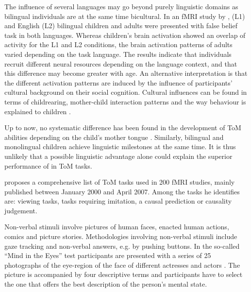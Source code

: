 \documentclass[output=paper]{LSP/langsci}
\begin{document}
The influence of several languages may go beyond purely linguistic domains as bilingual individuals are at the same time bicultural. In an fMRI study by \citet{Kobayashi2008},  (L1) and English (L2) bilingual children and adults were presented with false belief task in both languages. Whereas children's brain activation showed an overlap of activity for the L1 and L2 conditions, the brain activation patterns of adults varied depending on the task language. The results indicate that individuals recruit different neural resources depending on the language context, and that this difference may become greater with age. An alternative interpretation is that the different activation patterns are induced by the influence of participants' cultural background on their social cognition. Cultural influences can be found in terms of childrearing, mother-child interaction patterns and the way behaviour is explained to children \citep{Kobayashi2009}. 


Up to now, no systematic difference has been found in the development of ToM abilities depending on the child's mother tongue \citep[46]{Zufferey2010}. Similarly, bilingual and monolingual children achieve linguistic milestones at the same time. It is thus unlikely that a possible linguistic advantage alone could explain the superior performance of  in ToM tasks. 


 proposes a comprehensive list of ToM tasks used in 200 fMRI studies, mainly published between January 2000 and April 2007. Among the tasks he identifies are: viewing tasks, tasks requiring imitation, a causal prediction or causality judgement. 


Non-verbal stimuli involve pictures of human faces, enacted human actions, comics and picture stories. Methodologies involving non-verbal stimuli include gaze tracking and non-verbal answers, e.g. by pushing buttons. In the so-called ``Mind in the Eyes'' test participants are presented with a series of 25 photographs of the eye-region of the face of different actresses and actors \citep{BaronCohen2001}. The picture is accompanied by four descriptive terms and participants have to select the one that offers the best description of the person's mental state. 
\end{document}
